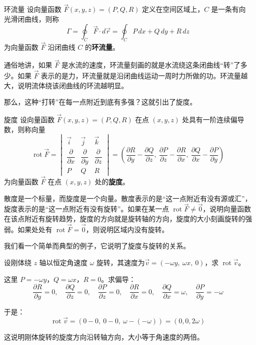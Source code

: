 \begin{definition}{环流量}{}
设向量函数 $\vec{F}(x,y,z)=(P,Q,R)$ 定义在空间区域上，$C$ 是一条有向光滑闭曲线，则称
\[\Gamma =
\oint_{C}\vec{F}\cdot d\vec{r}
=
\oint_{C}P\,dx+Q\,dy+R\,dz
\]
为向量函数 $\vec{F}$ 沿闭曲线 $C$ 的\textbf{环流量}。
\end{definition}

通俗地讲，如果 $\vec{F}$ 是水流的速度，环流量刻画的就是水流绕这条闭曲线“转”了多少。如果 $\vec{F}$ 表示的是力，环流量就是沿闭曲线运动一周时力所做的功。环流量越大，说明流体绕该闭曲线的环流越明显。

那么，这种“打转”在每一点附近到底有多强？这就引出了旋度。

\begin{definition}{旋度}{}
设向量函数 $\vec{F}(x,y,z)=(P,Q,R)$ 在点 $(x,y,z)$ 处具有一阶连续偏导数，则称向量
\[
\operatorname{rot}\vec{F}
=
\begin{vmatrix}
\vec{i} & \vec{j} & \vec{k} \\
\dfrac{\partial}{\partial x} & \dfrac{\partial}{\partial y} & \dfrac{\partial}{\partial z} \\
P & Q & R
\end{vmatrix}
=
\left(
\frac{\partial R}{\partial y}-\frac{\partial Q}{\partial z},
\ \frac{\partial P}{\partial z}-\frac{\partial R}{\partial x},
\ \frac{\partial Q}{\partial x}-\frac{\partial P}{\partial y}
\right)
\]
为向量函数 $\vec{F}$ 在点 $(x,y,z)$ 处的\textbf{旋度}。
\end{definition}


散度是一个标量，而旋度是一个向量。散度表示的是“这一点附近有没有源或汇”，旋度表示的是“这一点附近有没有旋转”。如果在某一点 $\operatorname{rot}\vec{F}\neq\vec{0}$，说明向量函数在该点附近有旋转趋势，旋度的方向就是旋转轴的方向，旋度的大小刻画旋转的强弱。如果处处有 $\operatorname{rot}\vec{F}=\vec{0}$，则说明区域内没有旋转。

我们看一个简单而典型的例子，它说明了旋度与旋转的关系。

\begin{myexample}
设刚体绕 $z$ 轴以恒定角速度 $\omega$ 旋转，其速度为\(
\vec{v}=(-\omega y,\ \omega x,\ 0)\)，求 $\operatorname{rot}\vec{v}$。

这里 $P=-\omega y$，$Q=\omega x$，$R=0$。求偏导：
\[
\frac{\partial R}{\partial y}=0,\quad \frac{\partial Q}{\partial z}=0,\quad
\frac{\partial P}{\partial z}=0,\quad \frac{\partial R}{\partial x}=0,\quad
\frac{\partial Q}{\partial x}=\omega,\quad \frac{\partial P}{\partial y}=-\omega
\]

于是：
\[
\operatorname{rot}\vec{v}
=
(0-0,\ 0-0,\ \omega-(-\omega))
=
(0,0,2\omega)
\]

这说明刚体旋转的旋度方向沿转轴方向，大小等于角速度的两倍。
\end{myexample}

